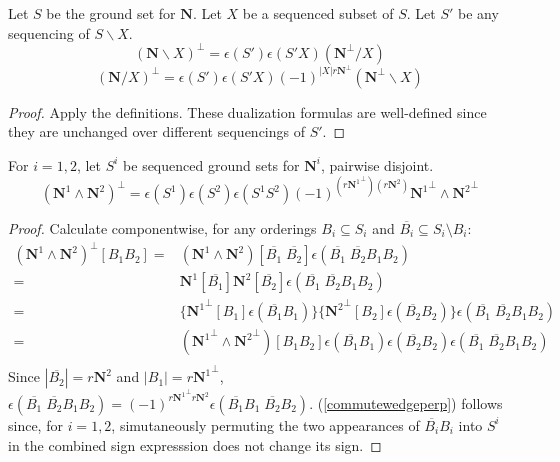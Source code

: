 \documentclass[Unicode]{cedram-alco}
\newcommand{\ext}[1]{\ensuremath{\mathbf{#1}}}
\begin{document}
\begin{prop}
  Let $S$ be the ground set for $\ext{N}$.
  Let $X$ be a sequenced subset of $S$.
  Let $S'$ be any sequencing of $S\backslash X$.
    \begin{equation} (\ext{N}\backslash X)^\perp = \epsilon(S')\epsilon(S'X)(\ext{N}^\perp/X)
    \end{equation}
    \begin{equation} (\ext{N}/X)^\perp = \epsilon(S')\epsilon(S'X)(-1)^{|X|r\ext{N}^\perp}(\ext{N}^\perp\backslash X)
    \end{equation}
\end{prop}
\begin{proof}
  Apply the definitions.  These dualization formulas are well-defined since they
  are unchanged over different sequencings of $S'$.
\end{proof}


\newcommand{\Nsup}[1]{\ext{N}^{#1}}
\newcommand{\NsupPerp}[1]{{\ext{N}^{#1}}^\perp}

\begin{prop}
  For $i=1, 2$, let $S^{i}$ be sequenced ground sets for $\ext{N}^{i}$, pairwise disjoint.
  \begin{equation}\label{commutewedgeperp}
    (\Nsup{1}\wedge\Nsup{2})^\perp =
    \epsilon(S^{1})\epsilon(S^{2})\epsilon(S^{1}S^{2})(-1)^{(r{\NsupPerp{1}})( r\Nsup{2})}
        \NsupPerp{1}\wedge\NsupPerp{2}
    \end{equation}
\end{prop}
\begin{proof}
  Calculate componentwise, for any orderings
  $B_i\subseteq S_i$ and $\overline{B_i}\subseteq S_i\setminus B_i$:
  \begin{equation*}
    \begin{split}
      (\Nsup{1}\wedge\Nsup{2})^\perp[B_1B_2]=
      &(\Nsup{1}\wedge\Nsup{2})[\overline{B_1}\;\overline{B_2}]
      \epsilon(\overline{B_1}\;\overline{B_2}B_1 B_2)\\
      =&\Nsup{1}[\overline{B_1}]\Nsup{2}[\overline{B_2}]\epsilon(\overline{B_1}\;\overline{B_2}B_1 B_2)\\
    =&\{\NsupPerp{1}[B_1]\epsilon(\overline{B_1}B_1)\}
    \{\NsupPerp{2}[B_2]\epsilon(\overline{B_2}B_2)\}\epsilon(\overline{B_1}\;\overline{B_2}B_1 B_2)\\
    =&(\NsupPerp{1}\wedge\NsupPerp{2})[B_1B_2]\epsilon(\overline{B_1}B_1)\epsilon(\overline{B_2}B_2)\epsilon(\overline{B_1}\;\overline{B_2}B_1 B_2)\\
    \end{split}
  \end{equation*}
  Since $|\overline{B_2}|=r\Nsup{2}$ and $|B_1|=r\NsupPerp{1}$,
$%
  \epsilon(\overline{B_1}\;\overline{B_2}B_1 B_2)=(-1)^{r\NsupPerp{1}r\Nsup{2}}\epsilon(\overline{B_1}B_1\;\overline{B_2} B_2)
$. %
  (\ref{commutewedgeperp}) follows since, for $i=1,2$, simutaneously permuting
  the two appearances of $\overline{B_i}B_i$ into $S^{i}$ in the combined sign expresssion does
  not change its sign.
\end{proof}
\end{document}
